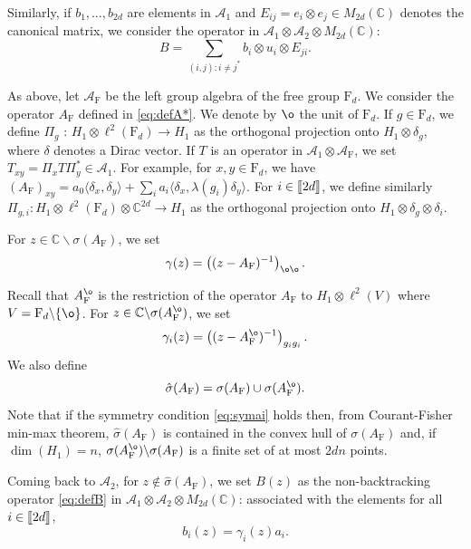 \documentclass[11pt]{article}
\renewcommand{\star}{{\mathrm{F}}}
\newcommand{\cA}{\mathcal{A}}
\newcommand{\dF}{\mathrm{F}}
\newcommand{\dC}{\mathbb {C}}
\newcommand{\1}{1\!\!{\sf I}}
\newcommand{\INT}[1]{{{\left[\hspace{-1.4pt}\left[#1\right]\hspace{-1.4pt}\right]}}}
\begin{document}
Similarly, if $b_1,\ldots, b_{2d}$ are elements in $\cA_1$ and $E_{ij} = e_i \otimes e_j \in M_{2d} (\dC)$ denotes the canonical matrix, we consider the operator in $\cA_1 \otimes \cA_2 \otimes M_{2d}(\dC)$: 
\begin{equation}\label{eq:defB}
B = \sum_{(i,j) : i \ne j^*} b_i  \otimes u_i \otimes E_{ji}.
\end{equation}

As above, let $\cA_\star$ be the left group algebra of the free group $\dF_d$. We consider the operator $A_{\star}$ defined in \eqref{eq:defA*}. We denote by $\o$ the unit of $\dF_d$.  If $g \in \dF_d$, we define $\Pi_g$ : $H_1  \otimes \ell^2(\dF_d) \to H_1$ as the orthogonal projection onto $H_1 \otimes \delta_{g}$, where $\delta$ denotes a Dirac vector.  If $T$ is an operator in $\cA_1 \otimes \cA_\star$, we set  $T_{xy} = \Pi_x T \Pi^*_y \in \cA_1$. For example, for $x,y \in \dF_d$, we have  
$(A_\star)_{xy} = a_0 \langle  \delta_x,  \delta_y \rangle + \sum_i a_i \langle  \delta_x, \lambda(g_i)  \delta_y \rangle. 
$
For $i \in \INT{2d}$, we define similarly $\Pi_{g,i} :  H_1 \otimes \ell^2(\dF_d) \otimes \dC^{2d} \to H_1$ as the orthogonal projection onto  $H_1 \otimes \delta_{g} \otimes \delta_i$.

For $z \in \dC \backslash \sigma(A_ \star)$, we set 
$$
\gamma(z) = \left( ( z- A_{\star})^{-1} \right)_{\o \o}.
$$

Recall that $A_\star^{\o}$ is the restriction of the operator $A_\star$ to $H_1 \otimes \ell^2 (V)$ where $V =  \dF_d\backslash \{\o\}$. For $z \in \dC \backslash  \sigma (A^{\o}_\star) $, we set 
$$
\gamma_i (z) = \left( (z - A^{\o}_{\star} )^{-1} \right)_{g_i g_i}.
$$
We also define
$$\hat \sigma(A_\star) =  \sigma(A_\star)  \cup \sigma(A_\star^{\o}).$$
 Note that if the symmetry condition \eqref{eq:symai} holds then, from Courant-Fisher min-max theorem, $\hat \sigma(A_\star)$ is contained in the convex hull of $\sigma(A_\star)$ and, if $\dim(H_1) = n$, $\sigma(A^{\o}_\star)\backslash  \sigma(A_\star)$ is a finite set of at most $2dn$ points.

Coming back to $\cA_2$, for $z \notin \hat\sigma(A_\star)$, we set $B(z)$ as the non-backtracking operator \eqref{eq:defB} in $\cA_1 \otimes \cA_2 \otimes M_{2d}(\dC)$:   associated with the elements for all $i \in \INT{2d}$,
$$b_i(z)  = \gamma_{i}(z) a_i.$$  
\end{document}
